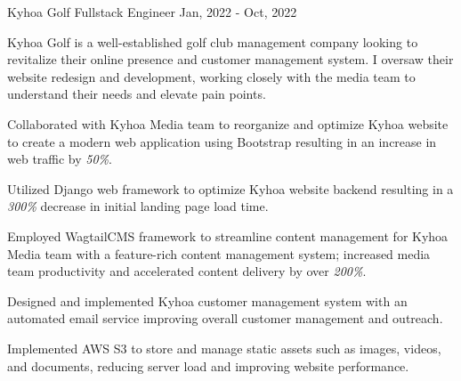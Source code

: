 \cventry
{Kyhoa Golf} %
{Fullstack Engineer} %
{ }
{Jan, 2022 - Oct, 2022} %
{
	Kyhoa Golf is a well-established golf club management company looking to revitalize their online presence and customer management system.
	I oversaw their website redesign and development, working closely with the media team to understand their needs and elevate pain points.
	\begin{cvitemsdesc}
		\item {Collaborated with Kyhoa Media team to reorganize and optimize Kyhoa website to create a modern web application using Bootstrap resulting in an increase in web traffic by \emph{50\%}.}
		\item {Utilized Django web framework to optimize Kyhoa website backend resulting in a \emph{300\%} decrease in initial landing page load time.}
		\item {Employed WagtailCMS framework to streamline content management for Kyhoa Media team with a feature-rich content management system; increased media team productivity and accelerated content delivery by over \emph{200\%}.}
		\item {Designed and implemented Kyhoa customer management system with an automated email service improving overall customer management and outreach.}
		\item {Implemented AWS S3 to store and manage static assets such as images, videos, and documents, reducing server load and improving website performance.}
	\end{cvitemsdesc}
}
